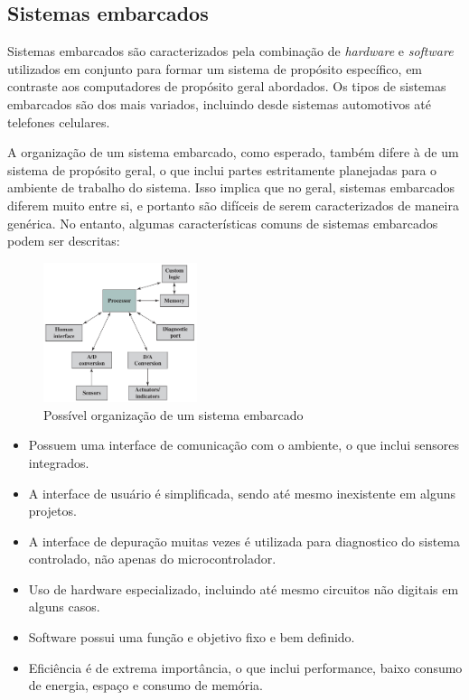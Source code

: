 \documentclass{article}
\begin{document}
\subsection{Sistemas embarcados}
Sistemas embarcados são caracterizados pela combinação de \textit{hardware} e
\textit{software} utilizados em conjunto para formar um sistema de propósito
específico, em contraste aos computadores de propósito geral abordados. Os tipos
de sistemas embarcados são dos mais variados, incluindo desde sistemas
automotivos até telefones celulares.

A organização de um sistema embarcado, como esperado, também difere à de um
sistema de propósito geral, o que inclui partes estritamente planejadas para o
ambiente de trabalho do sistema. Isso implica que no geral, sistemas embarcados
diferem muito entre si, e portanto são difíceis de serem caracterizados de
maneira genérica. No entanto, algumas características comuns de sistemas
embarcados podem ser descritas:

\begin{figure}[h]
    \centering
    \includegraphics[width=0.4\textwidth]{embarcado.png}
    \caption{Possível organização de um sistema embarcado}
\end{figure}

\begin{itemize}
    \item Possuem uma interface de comunicação com o ambiente,
        o que inclui sensores integrados.

    \item A interface de usuário é simplificada, sendo até mesmo
        inexistente em alguns projetos.

    \item A interface de depuração muitas vezes é utilizada para
        diagnostico do sistema controlado, não apenas do microcontrolador.

    \item Uso de hardware especializado, incluindo até mesmo circuitos
        não digitais em alguns casos.

    \item Software possui uma função e objetivo fixo e bem definido.

    \item Eficiência é de extrema importância, o que inclui performance,
        baixo consumo de energia, espaço e consumo de memória.
\end{itemize}
\end{document}
